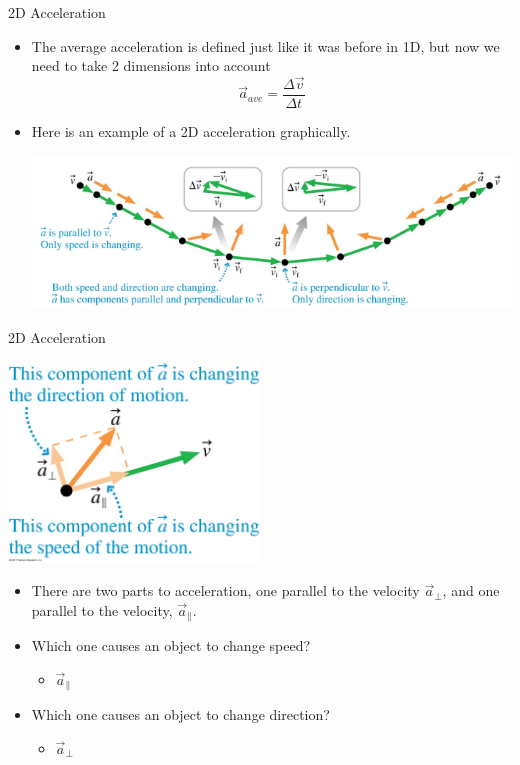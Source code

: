 \documentclass{beamer}
\begin{document}
\begin{frame}{2D Acceleration}
\begin{itemize}
   \item The average acceleration is defined just like it was before in 1D, but now we need to take 2 dimensions into account
   \begin{equation*}
      \vec{a}_{ave} = \frac{\Delta \vec{v}}{\Delta t}
   \end{equation*}
   \item<2-> Here is an example of a 2D acceleration graphically.
   \begin{center}
      \includegraphics[width=\textwidth]{../figures/EX04_02.png}
   \end{center}
\end{itemize}
\end{frame}

\begin{frame}{2D Acceleration}
\begin{center}
   \includegraphics[width=0.5\textwidth]{../figures/04_05_Figure.jpg}
\end{center}
\begin{itemize}
   \item<1-> There are two parts to acceleration, one parallel to the velocity $\vec{a}_\perp$, and one parallel to the velocity, $\vec{a}_\parallel$.
   \item<1-> Which one causes an object to change speed?
   \begin{itemize}
      \item<2-> $\vec{a}_\parallel$
   \end{itemize}
   \item<3-> Which one causes an object to change direction?
   \begin{itemize}
      \item<4-> $\vec{a}_\perp$
   \end{itemize}
\end{itemize}
\end{frame}
\end{document}
